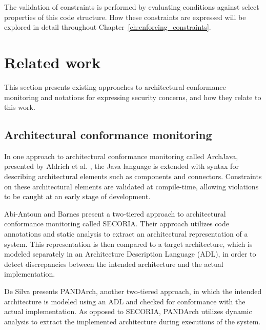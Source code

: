 The validation of constraints is performed by evaluating conditions against select properties of this code structure. How these constraints are expressed will be explored in detail throughout Chapter~\ref{ch:enforcing_constraints}.

\newpage





\section{Related work}
This section presents existing approaches to architectural conformance monitoring and notations for expressing security concerns, and how they relate to this work.

\subsection{Architectural conformance monitoring}

In one approach to architectural conformance monitoring called ArchJava, presented by Aldrich et al. \cite{aldrich_archjava_2002}, the Java language is extended with syntax for describing architectural elements such as components and connectors. Constraints on these architectural elements are validated at compile-time, allowing violations to be caught at an early stage of development.

Abi-Antoun and Barnes \cite{abi-antoun_analyzing_2010} present a two-tiered approach to architectural conformance monitoring called SECORIA. Their approach utilizes code annotations and static analysis to extract an architectural representation of a system. This representation is then compared to a target architecture, which is modeled separately in an Architecture Description Language (ADL), in order to detect discrepancies between the intended architecture and the actual implementation.

De Silva \cite{de_silva_towards_2014} presents PANDArch, another two-tiered approach, in which the intended architecture is modeled using an ADL and checked for conformance with the actual implementation. As opposed to SECORIA, PANDArch utilizes dynamic analysis to extract the implemented architecture during executions of the system. 

